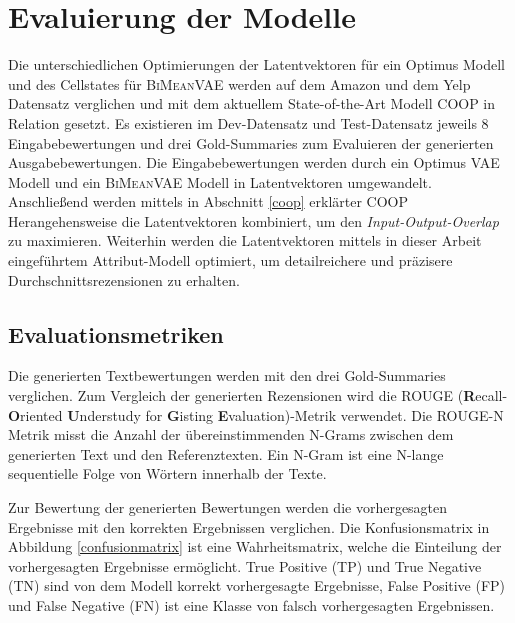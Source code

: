\section{Evaluierung der Modelle}\raggedbottom
\label{evalmetric}
Die unterschiedlichen Optimierungen der Latentvektoren für ein Optimus Modell und des Cellstates für \textsc{BiMeanVAE} werden auf dem Amazon und dem Yelp Datensatz verglichen und mit dem aktuellem State-of-the-Art Modell COOP in Relation gesetzt.
Es existieren im Dev-Datensatz und Test-Datensatz jeweils 8 Eingabebewertungen und drei Gold-Summaries zum Evaluieren der generierten Ausgabebewertungen.
Die Eingabebewertungen werden durch ein Optimus VAE Modell und ein \textsc{BiMeanVAE} Modell in Latentvektoren umgewandelt.
Anschließend werden mittels in Abschnitt \ref{coop} erklärter COOP Herangehensweise die Latentvektoren kombiniert, um den \textit{Input-Output-Overlap} zu maximieren. 
Weiterhin werden die Latentvektoren mittels in dieser Arbeit eingeführtem Attribut-Modell optimiert, um detailreichere und präzisere Durchschnittsrezensionen zu erhalten.


\subsection{Evaluationsmetriken}
Die generierten Textbewertungen werden mit den drei Gold-Summaries verglichen.
Zum Vergleich der generierten Rezensionen wird die ROUGE (\textbf{R}ecall-\textbf{O}riented \textbf{U}nderstudy for \textbf{G}isting \textbf{E}valuation)-Metrik verwendet.
Die ROUGE-N Metrik misst die Anzahl der übereinstimmenden N-Grams zwischen dem generierten Text und den Referenztexten. 
Ein N-Gram ist eine N-lange sequentielle Folge von Wörtern innerhalb der Texte. 

Zur Bewertung der generierten Bewertungen werden die vorhergesagten Ergebnisse mit den korrekten Ergebnissen verglichen. 
Die Konfusionsmatrix in Abbildung \ref{confusionmatrix} ist eine Wahrheitsmatrix, welche die Einteilung der vorhergesagten Ergebnisse ermöglicht. 
True Positive (TP) und True Negative (TN) sind von dem Modell korrekt vorhergesagte Ergebnisse, False Positive (FP) und False Negative (FN) ist eine Klasse von falsch vorhergesagten Ergebnissen.


